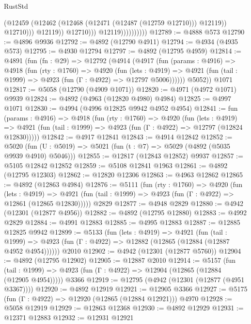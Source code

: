 \begin{lexlean}{RustStd}
\begin{coremodule}
                                      (@12459
                                        (@12462 (@12468 (@12471 (@12487 (@12759 @12710))) @12119))
                                        @12710)))
                                  @12119))
                              @12710)))
                        @12119))))))))))
@12789 := @4888 @573
@12790 := @4896 @9936
@12792 := @4892 (@12790 @4911)
@12794 := @4934 (@4935 @573)
@12795 := @4930 @12794
@12797 := @4892 (@12795 @4959)
@12814 := @4891
    (fun (fn : @29) =>
    @12792
      (@4914
        (@4917
          (fun (params : @4916) =>
          @4918
            (fun (rty : @1760) =>
            @4920
              (fun (lets : @4919) =>
              @4921 (fun (tail : @1999) => @4923 (fun (Γ : @4922) => @12797 @5006))))))
        @5052))
    @1071
@12817 := @5058 (@12790 (@4909 @1071))
@12820 := @4971 (@4972 @1071) @9939
@12824 := @4892 (@4963 (@12820 @4980) @4984)
@12825 := @4997 @1071
@12830 := @4994 (@4996 @12825 @9942 @4952 @4954)
@12841 := fun (params : @4916) =>
  @4918
    (fun (rty : @1760) =>
    @4920
      (fun (lets : @4919) =>
      @4921 (fun (tail : @1999) => @4923 (fun (Γ : @4922) => @12797 (@12824 @12830)))))
@12842 := @4917 @12841
@12843 := @4914 @12842
@12852 := @5020 (fun (U : @5019) => @5021 (fun (t : @7) => @5029 (@4892 (@5035 @9939 @4910) @5046)))
@12855 := @12817 (@12843 @12852) @9937
@12857 := @5105 @12842 @12852
@12859 := @5108 @12841 @1963
@12861 := @4892 (@12795 @12303)
@12862 := @12820 @12306
@12863 := @4963 @12862
@12865 := @4892 (@12863 @4984)
@12876 := @5111
    (fun (rty : @1760) =>
    @4920
      (fun (lets : @4919) =>
      @4921 (fun (tail : @1999) => @4923 (fun (Γ : @4922) => @12861 (@12865 @12830)))))
    @2829
@12877 := @4948 @2829
@12880 := @4942 (@12301 (@12877 @4956))
@12882 := @4892 (@12795 @12880)
@12883 := @4992 @2829
@12884 := @4991 @12883
@12885 := @4995 @12883
@12887 := @12885 @12825 @9942
@12899 := @5133
    (fun (lets : @4919) =>
    @4921
      (fun (tail : @1999) =>
      @4923 (fun (Γ : @4922) => @12882 (@12865 (@12884 (@12887 @4952 @4954))))))
    @2010
@12902 := @4942 (@12301 (@12877 @5760))
@12904 := @4892 (@12795 @12902)
@12905 := @12887 @2010
@12914 := @5157
    (fun (tail : @1999) => @4923 (fun (Γ : @4922) => @12904 (@12865 (@12884 (@12905 @4954)))))
    @3366
@12919 := @12795 (@4942 (@12301 (@12877 (@4951 @3367))))
@12920 := @4892 @12919
@12921 := @12905 @3366
@12927 := @5175 (fun (Γ : @4922) => @12920 (@12865 (@12884 @12921))) @4970
@12928 := @5058 @12919
@12929 := @12863 @12368
@12930 := @4892 @12929
@12931 := @12371 @12883
@12932 := @12931 @12921

\end{coremodule}
\end{lexlean}
